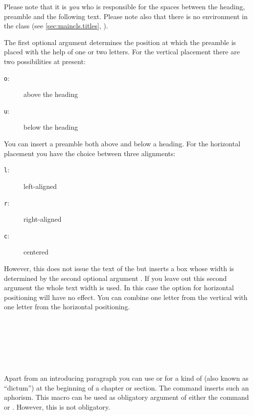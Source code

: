 Please note that it is \emph{you} who is responsible for the spaces
between the heading, preamble and the following text. Please note also
that there is no  environment in the class
 (see \autoref{sec:maincls.titles},
).

The first
optional argument  determines the position at which
the preamble is placed with the help of one or two letters. For the
vertical placement there are two possibilities at present:
\begin{description}
\item [\quad\texttt{o}:] above the heading
\item [\quad\texttt{u}:] below the heading
\end{description}
You can insert a preamble both above and below a heading. For the
horizontal placement you have the choice between three alignments:
\begin{description}
\item [\quad\texttt{l}:] left-aligned
\item [\quad\texttt{r}:] right-aligned
\item [\quad\texttt{c}:] centered
\end{description}
However, this does not issue the text of the  but
inserts a box whose width is determined by the second optional
argument . If you leave out this second argument the
whole text width is used. In this case the option for horizontal
positioning will have no effect. You can combine one letter from the
vertical with one letter from the horizontal positioning.
%
%
%


\begin{Declaration}
  \\
  \\
  \\
  \\
  \\
\end{Declaration}%
%
%
%
%
%
%
Apart%
 from an
introducing paragraph you can use  or
 for a kind of
 (also known as ``dictum'') at the
beginning of a chapter or section. The command  inserts
such an aphorism. This macro can be used as obligatory argument of
either the command  or
. However, this is not obligatory.

